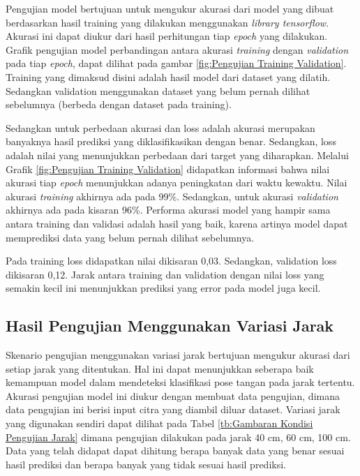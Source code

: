 \hfill \break

Pengujian model bertujuan untuk mengukur akurasi dari model yang dibuat berdasarkan hasil training yang dilakukan menggunakan \emph{library tensorflow}. Akurasi ini dapat diukur dari hasil perhitungan tiap \emph{epoch} yang dilakukan. Grafik pengujian model perbandingan antara akurasi \emph{training} dengan \emph{validation} pada tiap \emph{epoch}, dapat dilihat pada gambar \ref{fig:Pengujian Training Validation}. Training yang dimaksud disini adalah hasil model dari dataset yang dilatih. Sedangkan validation menggunakan dataset yang belum pernah dilihat sebelumnya (berbeda dengan dataset pada training).

Sedangkan untuk perbedaan akurasi dan loss adalah akurasi merupakan banyaknya hasil prediksi yang diklasifikasikan dengan benar. Sedangkan, loss adalah nilai yang menunjukkan perbedaan dari target yang diharapkan. Melalui Grafik \ref{fig:Pengujian Training Validation} didapatkan informasi bahwa nilai akurasi tiap \emph{epoch} menunjukkan adanya peningkatan dari waktu kewaktu. Nilai akurasi \emph{training} akhirnya ada pada 99\%. Sedangkan, untuk akurasi \emph{validation} akhirnya ada pada kisaran 96\%. Performa akurasi model yang hampir sama antara training dan validasi adalah hasil yang baik, karena artinya model dapat memprediksi data yang belum pernah dilihat sebelumnya.

Pada training loss didapatkan nilai dikisaran 0,03. Sedangkan, validation loss dikisaran 0,12. Jarak antara training dan validation dengan nilai loss yang semakin kecil ini menunjukkan prediksi yang error pada model juga kecil.

\subsection{Hasil Pengujian Menggunakan Variasi Jarak}
\label{subsec:Hasil Pengujian Menggunakan Variasi Jarak}

Skenario pengujian menggunakan variasi jarak bertujuan mengukur akurasi dari setiap jarak yang ditentukan. Hal ini dapat menunjukkan seberapa baik kemampuan model dalam mendeteksi klasifikasi pose tangan pada jarak tertentu. Akurasi pengujian model ini diukur dengan membuat data pengujian, dimana data pengujian ini berisi input citra yang diambil diluar dataset. Variasi jarak yang digunakan sendiri dapat dilihat pada Tabel \ref{tb:Gambaran Kondisi Pengujian Jarak} dimana pengujian dilakukan pada jarak 40 cm, 60 cm, 100 cm. Data yang telah didapat dapat dihitung berapa banyak data yang benar sesuai hasil prediksi dan berapa banyak yang tidak sesuai hasil prediksi.

